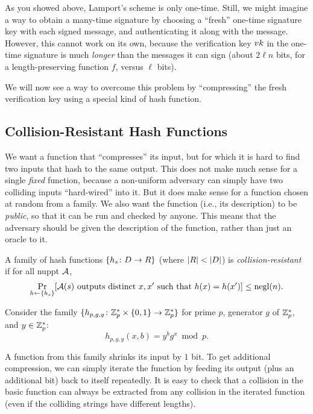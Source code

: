 \documentclass[11pt]{article}
\begin{document}
As you showed above, Lamport's scheme is only one-time. Still, we
might imagine a way to obtain a many-time signature by choosing a
``fresh'' one-time signature key with each signed message, and
authenticating it along with the message.  However, this cannot work
on its own, because the verification key $vk$ in the one-time
signature is much \emph{longer} than the messages it can sign (about
$2 \ell n$ bits, for a length-preserving function $f$, versus $\ell$
bits).

We will now see a way to overcome this problem by ``compressing'' the
fresh verification key using a special kind of hash function.

\subsection{Collision-Resistant Hash Functions}
\label{sec:coll-resist-hash}

We want a function that ``compresses'' its input, but for which it is
hard to find two inputs that hash to the same output.  This does not
make much sense for a single \emph{fixed} function, because a
non-uniform adversary can simply have two colliding inputs
``hard-wired'' into it.  But it does make sense for a function chosen
at random from a family.  We also want the function (i.e., its
description) to be \emph{public}, so that it can be run and checked by
anyone.  This means that the adversary should be given the description
of the function, rather than just an oracle to it.

\begin{definition}
  A family of hash functions $\{h_s \colon D \to R\}$ (where
  $\lvert R\rvert < \lvert D\rvert$) is \emph{collision-resistant} if for all nuppt
  $\mathcal{A}$,
  \[ \Pr_{h \gets \{ h_s \}} [\mathcal{A}(s) \text{ outputs distinct } x, x'
  \text{ such that } h(x) = h(x')] \leq \operatorname{negl}(n). \]
\end{definition}

\begin{example}
  Consider the family $\{h_{p,g,y} \colon \mathbb{Z}_p^{*} \times \{0,1\} \to
    \mathbb{Z}_p^{*}\}$ for prime $p$, generator $g$ of $\mathbb{Z}_p^*$, and $y \in
  \mathbb{Z}_p^*$:
  \[h_{p,g,y}(x,b) = y^b g^x \bmod p. \]
\end{example}

A function from this family shrinks its input by $1$ bit.  To get
additional compression, we can simply iterate the function by feeding
its output (plus an additional bit) back to itself repeatedly.  It is
easy to check that a collision in the basic function can always be
extracted from any collision in the iterated function (even if the
colliding strings have different lengths).
\end{document}
